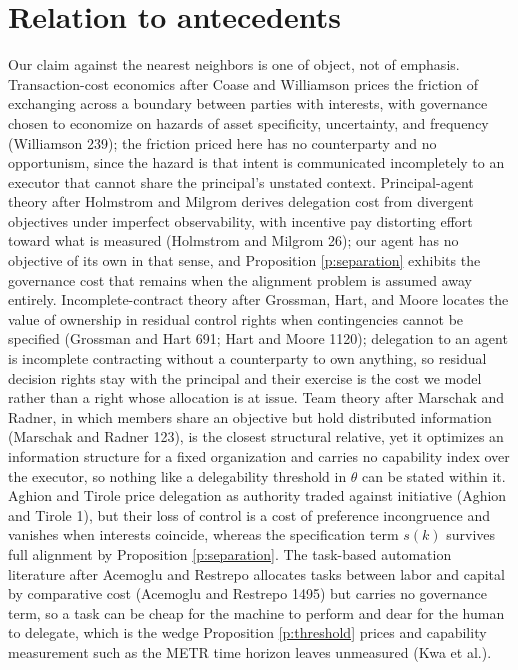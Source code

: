 \documentclass[10pt]{article}
\theoremstyle{remark}
\begin{document}
\section{Relation to antecedents}

Our claim against the nearest neighbors is one of object, not of emphasis. Transaction-cost economics after Coase and Williamson prices the friction of exchanging across a boundary between parties with interests, with governance chosen to economize on hazards of asset specificity, uncertainty, and frequency (Williamson 239); the friction priced here has no counterparty and no opportunism, since the hazard is that intent is communicated incompletely to an executor that cannot share the principal's unstated context. Principal-agent theory after Holmstrom and Milgrom derives delegation cost from divergent objectives under imperfect observability, with incentive pay distorting effort toward what is measured (Holmstrom and Milgrom 26); our agent has no objective of its own in that sense, and Proposition \ref{p:separation} exhibits the governance cost that remains when the alignment problem is assumed away entirely. Incomplete-contract theory after Grossman, Hart, and Moore locates the value of ownership in residual control rights when contingencies cannot be specified (Grossman and Hart 691; Hart and Moore 1120); delegation to an agent is incomplete contracting without a counterparty to own anything, so residual decision rights stay with the principal and their exercise is the cost we model rather than a right whose allocation is at issue. Team theory after Marschak and Radner, in which members share an objective but hold distributed information (Marschak and Radner 123), is the closest structural relative, yet it optimizes an information structure for a fixed organization and carries no capability index over the executor, so nothing like a delegability threshold in $\theta$ can be stated within it. Aghion and Tirole price delegation as authority traded against initiative (Aghion and Tirole 1), but their loss of control is a cost of preference incongruence and vanishes when interests coincide, whereas the specification term $s(k)$ survives full alignment by Proposition \ref{p:separation}. The task-based automation literature after Acemoglu and Restrepo allocates tasks between labor and capital by comparative cost (Acemoglu and Restrepo 1495) but carries no governance term, so a task can be cheap for the machine to perform and dear for the human to delegate, which is the wedge Proposition \ref{p:threshold} prices and capability measurement such as the METR time horizon leaves unmeasured (Kwa et al.).
\end{document}
